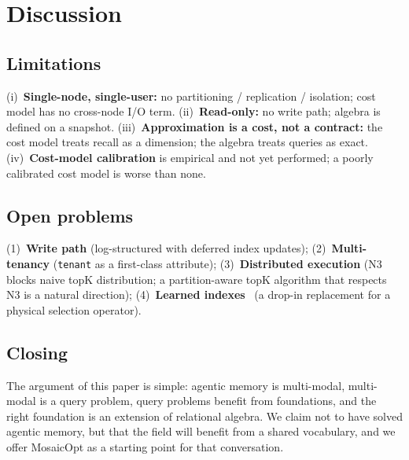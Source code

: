 \documentclass[sigconf]{acmart}
\theoremstyle{plain}
\theoremstyle{definition}
\theoremstyle{remark}
\begin{document}
\section{Discussion}\label{app:discuss}

\subsection{Limitations}\label{sec:discuss:limitations}

(i)~\textbf{Single-node, single-user:} no partitioning /
replication / isolation; cost model has no cross-node I/O term.
(ii)~\textbf{Read-only:} no write path; algebra is defined on a
snapshot. (iii)~\textbf{Approximation is a cost, not a contract:}
the cost model treats recall as a dimension; the algebra treats
queries as exact. (iv)~\textbf{Cost-model calibration} is
empirical and not yet performed; a poorly calibrated cost model
is worse than none.

\subsection{Open problems}\label{sec:discuss:open}

(1)~\textbf{Write path} (log-structured with deferred index
updates); (2)~\textbf{Multi-tenancy} (\texttt{tenant} as a
first-class attribute); (3)~\textbf{Distributed execution}
(N3 blocks naive topK distribution; a partition-aware topK
algorithm that respects N3 is a natural direction);
(4)~\textbf{Learned indexes}~\cite{kraska2018} (a drop-in
replacement for a physical selection operator).

\subsection{Closing}\label{sec:discuss:closing}

The argument of this paper is simple: agentic memory is
multi-modal, multi-modal is a query problem, query problems
benefit from foundations, and the right foundation is an
extension of relational algebra. We claim not to have solved
agentic memory, but that the field will benefit from a shared
vocabulary, and we offer MosaicOpt as a starting point for that
conversation.


\end{document}
